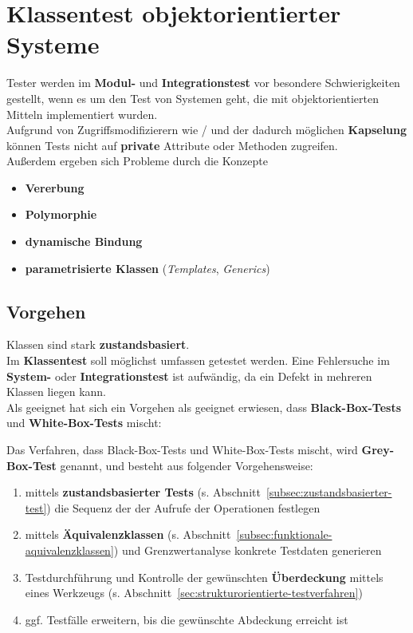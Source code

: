 \section{Klassentest objektorientierter Systeme}
Tester werden im \textbf{Modul-} und \textbf{Integrationstest} vor besondere Schwierigkeiten gestellt, wenn es um den Test von Systemen geht, die mit objektorientierten Mitteln implementiert wurden.\\
Aufgrund von Zugriffsmodifizierern wie  /  und der dadurch möglichen \textbf{Kapselung} können Tests nicht auf \textbf{private} Attribute oder Methoden zugreifen.\\
Außerdem ergeben sich Probleme durch die Konzepte

\begin{itemize}
    \item \textbf{Vererbung}
    \item \textbf{Polymorphie}
    \item \textbf{dynamische Bindung}
    \item \textbf{parametrisierte Klassen} (\textit{Templates}, \textit{Generics})
\end{itemize}

\subsection*{Vorgehen}
Klassen sind stark \textbf{zustandsbasiert}.\\
Im \textbf{Klassentest} soll möglichst umfassen getestet werden.
Eine Fehlersuche im \textbf{System-} oder \textbf{Integrationstest} ist aufwändig, da ein Defekt in mehreren Klassen liegen kann.\\
Als geeignet hat sich ein Vorgehen als geeignet erwiesen, dass \textbf{Black-Box-Tests} und \textbf{White-Box-Tests} mischt:

\begin{tcolorbox}[title=Grey-Box-Test]
    Das Verfahren, dass Black-Box-Tests und White-Box-Tests mischt, wird \textbf{Grey-Box-Test} genannt, und besteht aus folgender Vorgehensweise:
    \begin{enumerate}
        \item mittels \textbf{zustandsbasierter Tests} (s. Abschnitt~\ref{subsec:zustandsbasierter-test}) die Sequenz der der Aufrufe der Operationen festlegen
        \item mittels \textbf{Äquivalenzklassen} (s. Abschnitt~\ref{subsec:funktionale-aquivalenzklassen}) und Grenzwertanalyse konkrete Testdaten generieren
        \item Testdurchführung und Kontrolle der gewünschten \textbf{Überdeckung} mittels eines Werkzeugs (s. Abschnitt~\ref{sec:strukturorientierte-testverfahren})
        \item ggf. Testfälle erweitern, bis die gewünschte Abdeckung erreicht ist
    \end{enumerate}
\end{tcolorbox}

